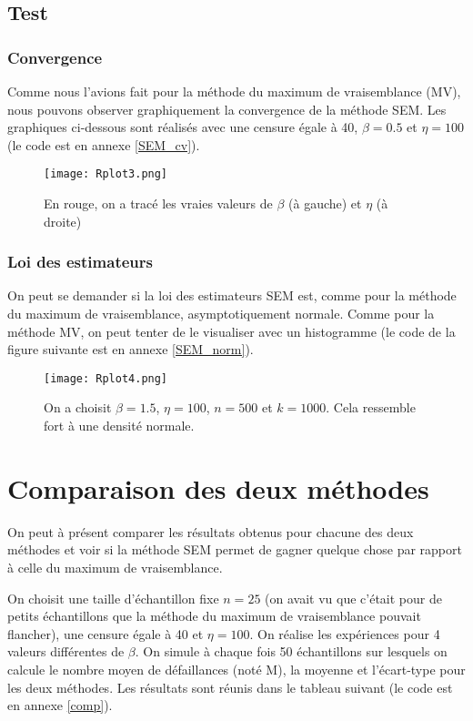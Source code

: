 \documentclass[a4paper]{report}
\begin{document}
 \section{Test}
 
 \subsection{Convergence}
 
 Comme nous l'avions fait pour la méthode du maximum de vraisemblance (MV), nous pouvons observer graphiquement la convergence de la méthode SEM. Les graphiques ci-dessous sont réalisés avec une censure égale à 40, $\beta=0.5$ et $\eta=100$ (le code est en annexe \ref{SEM_cv}).
 
\begin{figure}[!ht]
	\centering
     	\texttt{[image: Rplot3.png]}

	\caption{En rouge, on a tracé les vraies valeurs de $\beta$ (à gauche) et $\eta$ (à droite)}
\end{figure}  

 \subsection{Loi des estimateurs}
 
 On peut se demander si la loi des estimateurs SEM est, comme pour la méthode du maximum de vraisemblance, asymptotiquement normale. Comme pour la méthode MV, on peut tenter de le visualiser avec un histogramme (le code de la figure suivante est en annexe \ref{SEM_norm}). 
 
 \begin{figure}[!ht]
	\centering
     	\texttt{[image: Rplot4.png]}

	\caption{On a choisit $\beta=1.5$, $\eta=100$, $n=500$ et $k=1000$. Cela ressemble fort à une densité normale.}
\end{figure}
  
\chapter{Comparaison des deux méthodes}

 On peut à présent comparer les résultats obtenus pour chacune des deux méthodes et voir si la méthode SEM permet de gagner quelque chose par rapport à celle du maximum de vraisemblance. 
 
 On choisit une taille d'échantillon fixe $n=25$ (on avait vu que c'était pour de petits échantillons que la méthode du maximum de vraisemblance pouvait flancher), une censure égale à 40 et $\eta=100$. On réalise les expériences pour 4 valeurs différentes de $\beta$. On simule à chaque fois 50 échantillons sur lesquels on calcule le nombre moyen de défaillances (noté M), la moyenne et l'écart-type pour les deux méthodes. Les résultats sont réunis dans le tableau suivant (le code est en annexe \ref{comp}).
 
\end{document}
